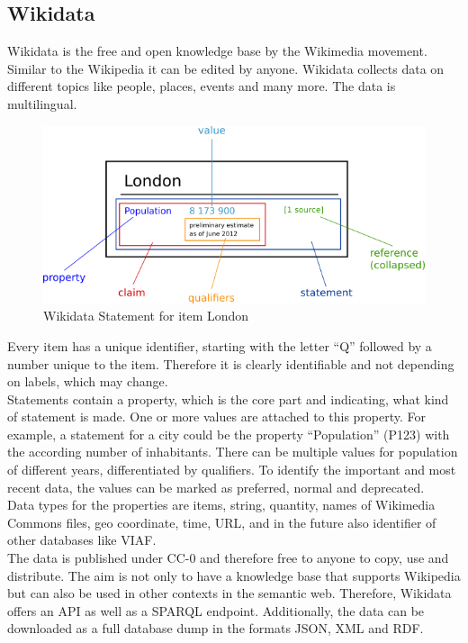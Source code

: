 \subsection{Wikidata}
Wikidata is the free and open knowledge base by the Wikimedia movement. Similar to the Wikipedia it can be edited by anyone. Wikidata collects data on different topics like people, places, events and many more. The data is multilingual.
\begin{figure}[ht]
	\centering
	\includegraphics[width=120mm]{diagrams/Wikidata_statement.png}
	\caption{Wikidata Statement for item London}
	\label{fig1}
\end{figure}

Every item has a unique identifier, starting with the letter ``Q'' followed by a number unique to the item. Therefore it is clearly identifiable and not depending on labels, which may change. \\
Statements contain a property, which is the core part and indicating, what kind of statement is made. One or more values are attached to this property. For example, a statement for a city could be the property ``Population'' (P123)  with the according number of inhabitants. There can be multiple values for population of different years, differentiated by qualifiers. To identify the important and most recent data, the values can be marked as preferred, normal and deprecated.\\
Data types for the properties  are items, string, quantity, names of Wikimedia Commons files, geo coordinate, time, URL,  and in the future also identifier of other databases like VIAF. \\
The data is published under CC-0 and therefore free to anyone to copy, use and distribute.
The aim is not only to have a knowledge base that supports Wikipedia but can also be used in other contexts in the semantic web. Therefore, Wikidata offers an API as well as a SPARQL endpoint. Additionally, the data can be downloaded as a full database dump in the formats JSON, XML and RDF.  